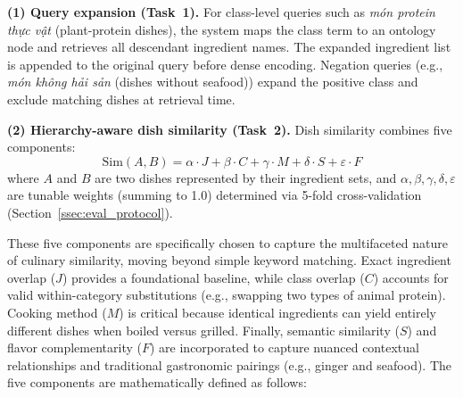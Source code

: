\textbf{(1) Query expansion (Task~1).}
For class-level queries such as \textit{món protein thực vật}
(plant-protein dishes), the system maps the class term to an ontology node and retrieves all descendant ingredient names. The expanded ingredient list is appended to the original query before dense encoding. Negation queries (e.g., \textit{món không hải sản}
(dishes without seafood)) expand the positive class and exclude matching dishes at retrieval time.

\textbf{(2) Hierarchy-aware dish similarity (Task~2).}
Dish similarity combines five components:
%
\begin{equation}
\label{eq:sim}
\text{Sim}(A, B) = \alpha \cdot J + \beta \cdot C + \gamma \cdot M + \delta \cdot S + \varepsilon \cdot F
\end{equation}
%
where $A$ and $B$ are two dishes represented by their ingredient sets, and $\alpha, \beta, \gamma, \delta, \varepsilon$ are tunable weights (summing to 1.0) determined via 5-fold cross-validation (Section~\ref{ssec:eval_protocol}). 

These five components are specifically chosen to capture the multifaceted nature of culinary similarity, moving beyond simple keyword matching. Exact ingredient overlap ($J$) provides a foundational baseline, while class overlap ($C$) accounts for valid within-category substitutions (e.g., swapping two types of animal protein). Cooking method ($M$) is critical because identical ingredients can yield entirely different dishes when boiled versus grilled. Finally, semantic similarity ($S$) and flavor complementarity ($F$) are incorporated to capture nuanced contextual relationships and traditional gastronomic pairings (e.g., ginger and seafood). The five components are mathematically defined as follows:

